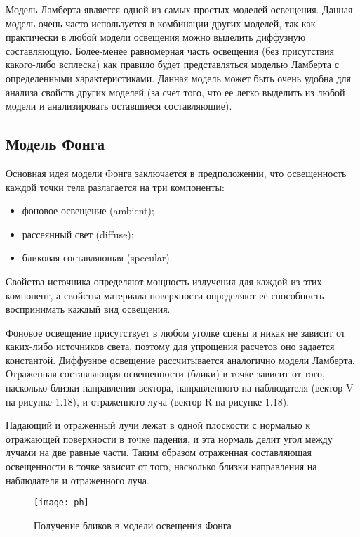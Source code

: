 \documentclass[12pt,a4paper,oneside]{report}
\begin{document}
	 Модель Ламберта является одной из самых простых моделей освещения. Данная модель очень часто используется в комбинации других моделей, так как практически в любой модели освещения можно выделить диффузную составляющую. Более-менее равномерная часть освещения (без присутствия какого-либо всплеска) как правило будет представляться моделью Ламберта с определенными характеристиками. Данная модель может быть очень удобна для анализа свойств других моделей (за счет того, что ее легко выделить из любой модели и анализировать оставшиеся составляющие).
	
	
	\subsection{Модель Фонга}
	
	 \quad Основная идея модели Фонга заключается в предположении, что освещенность каждой точки тела разлагается на три компоненты:
	\begin{itemize}
		\item фоновое освещение (ambient);
		\item рассеянный свет (diffuse);
		\item бликовая составляющая (specular).
	\end{itemize}

	 Свойства источника определяют мощность излучения для каждой из этих компонент, а свойства материала поверхности определяют ее способность воспринимать каждый вид освещения.
	
	 Фоновое освещение присутствует в любом уголке сцены и никак не зависит от каких-либо источников света, поэтому для упрощения расчетов оно задается константой. Диффузное освещение рассчитывается аналогично модели Ламберта. Отраженная составляющая освещенности (блики) в точке зависит от того, насколько близки направления вектора, направленного на наблюдателя (вектор V на рисунке 1.18), и отраженного луча (вектор R на рисунке 1.18).
	
	 Падающий и отраженный лучи лежат в одной плоскости с нормалью к отражающей поверхности в точке падения, и эта нормаль делит угол между лучами на две равные части. Таким образом отраженная составляющая освещенности в точке зависит от того, насколько близки направления на наблюдателя и отраженного луча.
	
	\begin{figure}[h]
		\centering
		\texttt{[image: ph]}
		\caption{Получение бликов в модели освещения Фонга}
		\label{fig:screenshot003}
	\end{figure}
\end{document}
